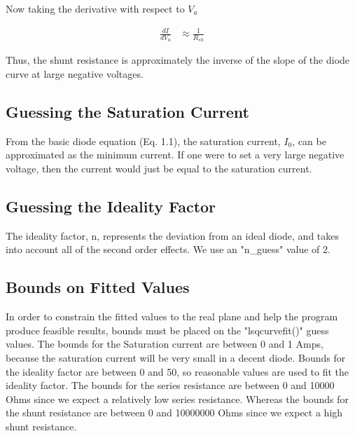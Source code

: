 \documentclass[12pt]{article}
\numberwithin{equation}{section}
\begin{document}
Now taking the derivative with respect to $V_a$

\begin{align}
\frac{dI}{dV_a} &\approx \frac{1}{R_{sh}}
\end{align}

Thus, the shunt resistance is approximately the inverse of the slope of the diode curve at large negative voltages.\\

\subsection{Guessing the Saturation Current}

From the basic diode equation (Eq. 1.1), the saturation current, $I_0$, can be approximated as the minimum current. If one were to set a very large negative voltage, then the current would just be equal to the saturation current.
\subsection{Guessing the Ideality Factor}

The ideality factor, n, represents the deviation from an ideal diode, and takes into account all of the second order effects. We use an "n_guess" value of 2.

\subsection{Bounds on Fitted Values}
In order to constrain the fitted values to the real plane and help the program produce feasible results, bounds must be placed on the "lsqcurvefit()" guess values. The bounds for the Saturation current are between 0 and 1 Amps, because the saturation current will be very small in a decent diode. Bounds for the ideality factor are between 0 and 50, so reasonable values are used to fit the ideality factor. The bounds for the series resistance are between 0 and 10000 Ohms since we expect a relatively low series resistance. Whereas the bounds for the shunt resistance are between 0 and 10000000 Ohms since we expect a high shunt resistance.
\\



\end{document}
